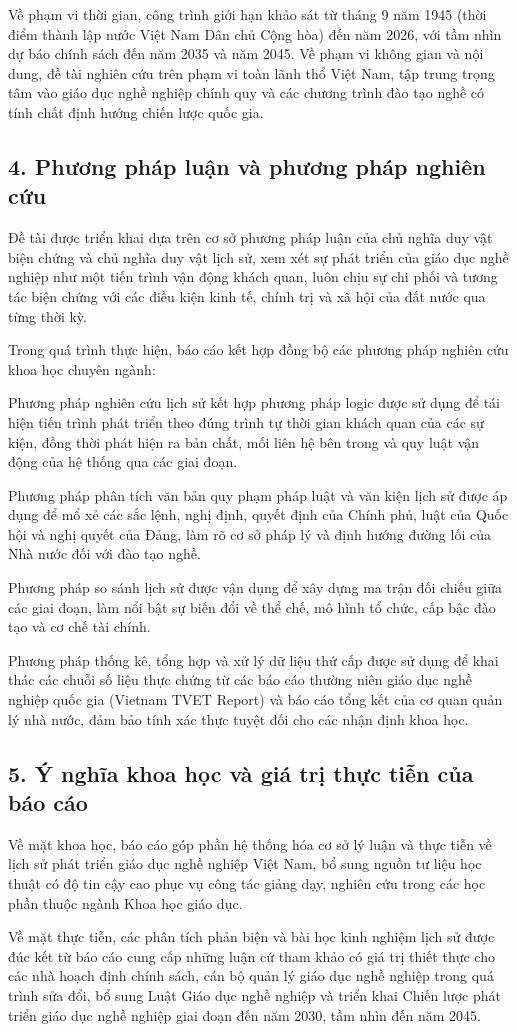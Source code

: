 Về phạm vi thời gian, công trình giới hạn khảo sát từ tháng 9 năm 1945 (thời điểm thành lập nước Việt Nam Dân chủ Cộng hòa) đến năm 2026, với tầm nhìn dự báo chính sách đến năm 2035 và năm 2045. Về phạm vi không gian và nội dung, đề tài nghiên cứu trên phạm vi toàn lãnh thổ Việt Nam, tập trung trọng tâm vào giáo dục nghề nghiệp chính quy và các chương trình đào tạo nghề có tính chất định hướng chiến lược quốc gia.

\subsection*{4. Phương pháp luận và phương pháp nghiên cứu}

Đề tài được triển khai dựa trên cơ sở phương pháp luận của chủ nghĩa duy vật biện chứng và chủ nghĩa duy vật lịch sử, xem xét sự phát triển của giáo dục nghề nghiệp như một tiến trình vận động khách quan, luôn chịu sự chi phối và tương tác biện chứng với các điều kiện kinh tế, chính trị và xã hội của đất nước qua từng thời kỳ.

Trong quá trình thực hiện, báo cáo kết hợp đồng bộ các phương pháp nghiên cứu khoa học chuyên ngành:

Phương pháp nghiên cứu lịch sử kết hợp phương pháp logic được sử dụng để tái hiện tiến trình phát triển theo đúng trình tự thời gian khách quan của các sự kiện, đồng thời phát hiện ra bản chất, mối liên hệ bên trong và quy luật vận động của hệ thống qua các giai đoạn.

Phương pháp phân tích văn bản quy phạm pháp luật và văn kiện lịch sử được áp dụng để mổ xẻ các sắc lệnh, nghị định, quyết định của Chính phủ, luật của Quốc hội và nghị quyết của Đảng, làm rõ cơ sở pháp lý và định hướng đường lối của Nhà nước đối với đào tạo nghề.

Phương pháp so sánh lịch sử được vận dụng để xây dựng ma trận đối chiếu giữa các giai đoạn, làm nổi bật sự biến đổi về thể chế, mô hình tổ chức, cấp bậc đào tạo và cơ chế tài chính.

Phương pháp thống kê, tổng hợp và xử lý dữ liệu thứ cấp được sử dụng để khai thác các chuỗi số liệu thực chứng từ các báo cáo thường niên giáo dục nghề nghiệp quốc gia (Vietnam TVET Report) và báo cáo tổng kết của cơ quan quản lý nhà nước, đảm bảo tính xác thực tuyệt đối cho các nhận định khoa học.

\subsection*{5. Ý nghĩa khoa học và giá trị thực tiễn của báo cáo}

Về mặt khoa học, báo cáo góp phần hệ thống hóa cơ sở lý luận và thực tiễn về lịch sử phát triển giáo dục nghề nghiệp Việt Nam, bổ sung nguồn tư liệu học thuật có độ tin cậy cao phục vụ công tác giảng dạy, nghiên cứu trong các học phần thuộc ngành Khoa học giáo dục.

Về mặt thực tiễn, các phân tích phản biện và bài học kinh nghiệm lịch sử được đúc kết từ báo cáo cung cấp những luận cứ tham khảo có giá trị thiết thực cho các nhà hoạch định chính sách, cán bộ quản lý giáo dục nghề nghiệp trong quá trình sửa đổi, bổ sung Luật Giáo dục nghề nghiệp và triển khai Chiến lược phát triển giáo dục nghề nghiệp giai đoạn đến năm 2030, tầm nhìn đến năm 2045.
